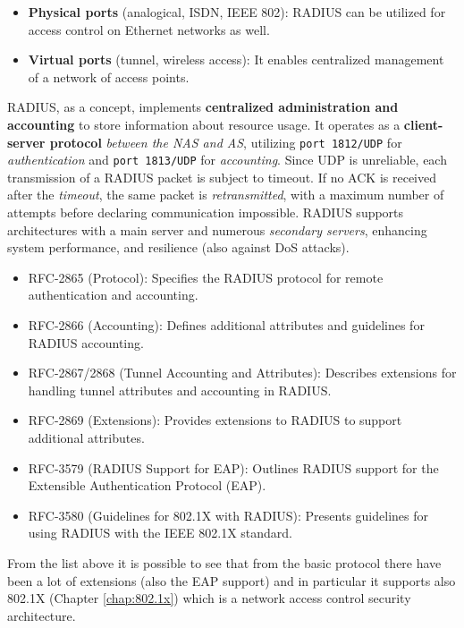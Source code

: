 \begin{itemize}
    \item \textbf{Physical ports} (analogical, ISDN, IEEE 802): RADIUS can be utilized for access control on Ethernet networks as well.
    \item \textbf{Virtual ports} (tunnel, wireless access): It enables centralized management of a network of access points.
\end{itemize}

RADIUS, as a concept, implements \textbf{centralized administration and accounting} to store information about resource usage. It operates as a \textbf{client-server protocol} \textit{between the NAS and AS}, utilizing \texttt{port 1812/UDP} for \textit{authentication} and \texttt{port 1813/UDP} for \textit{accounting}.
Since UDP is unreliable, each transmission of a RADIUS packet is subject to timeout. If no ACK is received after the \textit{timeout}, the same packet is \textit{retransmitted}, with a maximum number of attempts before declaring communication impossible.
RADIUS supports architectures with a main server and numerous \textit{secondary servers}, enhancing system performance, and resilience (also against DoS attacks).

\begin{itemize}
    \item RFC-2865 (Protocol): Specifies the RADIUS protocol for remote authentication and accounting.
    \item RFC-2866 (Accounting): Defines additional attributes and guidelines for RADIUS accounting.
    \item RFC-2867/2868 (Tunnel Accounting and Attributes): Describes extensions for handling tunnel attributes and accounting in RADIUS.
    \item RFC-2869 (Extensions): Provides extensions to RADIUS to support additional attributes.
    \item RFC-3579 (RADIUS Support for EAP): Outlines RADIUS support for the Extensible Authentication Protocol (EAP).
    \item RFC-3580 (Guidelines for 802.1X with RADIUS): Presents guidelines for using RADIUS with the IEEE 802.1X standard.
\end{itemize}

From the list above it is possible to see that from the basic protocol there have been a lot of extensions (also
the EAP support) and in particular it supports also 802.1X (Chapter \ref{chap:802.1x}) which is a network access control security
architecture.


